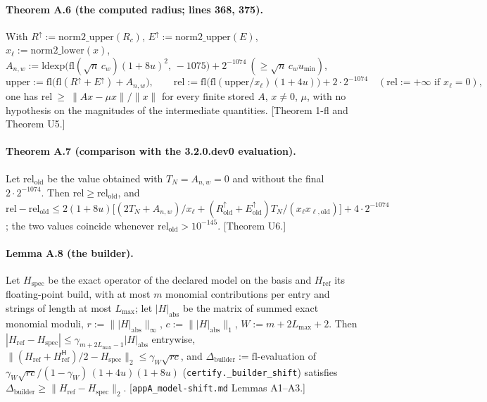 \paragraph{Theorem A.6 (the computed radius; lines 368, 375).}
With $R^{\uparrow} := \mathrm{norm2\_upper}(R_c)$, $E^{\uparrow} := \mathrm{norm2\_upper}(E)$, $x_\ell := \mathrm{norm2\_lower}(x)$,
$A_{n,w} := \mathrm{ldexp}\big(\mathrm{fl}(\sqrt{n}\,c_w)(1+8u)^2,\,-1075\big) + 2^{-1074}\ (\ge \sqrt{n}\,c_w u_{\min})$,
\[
\mathrm{upper} := \mathrm{fl}\big(\mathrm{fl}(R^{\uparrow}+E^{\uparrow}) + A_{n,w}\big),\qquad
\mathrm{rel} := \mathrm{fl}\big(\mathrm{fl}(\mathrm{upper}/x_\ell)(1+4u)\big) + 2\cdot 2^{-1074}\quad(\mathrm{rel}:=+\infty \text{ if } x_\ell = 0),
\]
one has $\mathrm{rel}\ \ge\ \|Ax-\mu x\|/\|x\|$ for every finite stored $A$, $x\ne 0$, $\mu$, with no hypothesis on the
magnitudes of the intermediate quantities. [Theorem 1-fl and Theorem U5.]

\paragraph{Theorem A.7 (comparison with the 3.2.0.dev0 evaluation).}
Let $\mathrm{rel}_{\mathrm{old}}$ be the value obtained with $T_N = A_{n,w} = 0$ and without the final $2\cdot 2^{-1074}$.
Then $\mathrm{rel}\ge \mathrm{rel}_{\mathrm{old}}$, and $\mathrm{rel}-\mathrm{rel}_{\mathrm{old}} \le
2(1+8u)\big[(2T_N + A_{n,w})/x_\ell + (R^{\uparrow}_{\mathrm{old}}+E^{\uparrow}_{\mathrm{old}})T_N/(x_\ell x_{\ell,\mathrm{old}})\big] + 4\cdot 2^{-1074}$;
the two values coincide whenever $\mathrm{rel}_{\mathrm{old}} > 10^{-145}$. [Theorem U6.]

\paragraph{Lemma A.8 (the builder).}
Let $H_{\mathrm{spec}}$ be the exact operator of the declared model on the basis and $H_{\mathrm{ref}}$ its floating-point
build, with at most $m$ monomial contributions per entry and strings of length at most $L_{\max}$; let $|H|_{\mathrm{abs}}$
be the matrix of summed exact monomial moduli, $r := \||H|_{\mathrm{abs}}\|_\infty$, $c := \||H|_{\mathrm{abs}}\|_1$, $W := m+2L_{\max}+2$.
Then $|H_{\mathrm{ref}}-H_{\mathrm{spec}}| \le \gamma_{m+2L_{\max}-1}|H|_{\mathrm{abs}}$ entrywise,
$\|(H_{\mathrm{ref}}+H_{\mathrm{ref}}^{\mathsf H})/2 - H_{\mathrm{spec}}\|_2 \le \gamma_W\sqrt{rc}$, and
$\Delta_{\mathrm{builder}} := \mathrm{fl}$-evaluation of $\gamma_W\sqrt{rc}/(1-\gamma_W)\,(1+4u)(1+8u)$
(\texttt{certify.\_builder\_shift}) satisfies $\Delta_{\mathrm{builder}}\ge \|H_{\mathrm{ref}}-H_{\mathrm{spec}}\|_2$.
[\texttt{appA\_model-shift.md} Lemmas A1--A3.]

